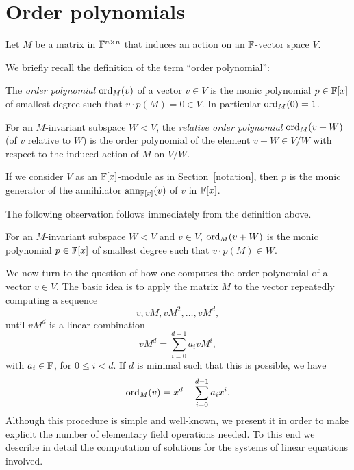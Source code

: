 \section{Order polynomials}
\label{ordpoly}

Let $M$ be a matrix in $\mathbb{F}^{n \times n}$ that induces an action
on an $\mathbb{F}$-vector space $V$.

We briefly recall the definition of the term ``order polynomial'':

\begin{Def}
{\rm
The \emph{order polynomial} $\mathrm{ord}_M(v)$ of a vector $v \in V$ is the
%
%
monic polynomial $p \in \mathbb{F}[x]$ of smallest degree such that $v \cdot
p(M) = 0 \in V$. In particular $\mathrm{ord}_M(0)=1$.

For an $M$-invariant subspace  $W < V$, the \emph{relative order polynomial}
$\mathrm{ord}_M(v+W)$ (of $v$ relative to $W$) is the order polynomial of the element
$v+W \in V/W$ with respect to the induced action of $M$ on $V/W$.
}
\end{Def}

\begin{Rem}
If we consider $V$ as an $\mathbb{F}[x]$-module as in 
Section~\ref{notation}, then $p$ is the monic generator
of the annihilator $\mathrm{ann}_{\mathbb{F}[x]}(v)$ of $v$ in $\mathbb{F}[x]$.
\end{Rem}

The following observation follows immediately from the definition above.

\begin{Lemm}
\label{relorderpol}
%
For an $M$-invariant subspace  $W < V$ and $v\in V$, 
$\mathrm{ord}_M(v+W)$ is the monic polynomial $p \in \mathbb{F}[x]$ of smallest degree such 
that $v \cdot p(M) \in W$.
\end{Lemm}

We now turn to the question of how one computes the order polynomial of
a vector $v \in V$. The basic idea is to apply the matrix
$M$ to the vector repeatedly computing a sequence \[ v, vM, vM^2, \ldots,
vM^d, \]
until $vM^d$ is a linear combination
\[ 
vM^d = \sum_{i=0}^{d-1} a_i vM^i, 
\]
with $a_i \in \mathbb{F}$, for $0 \le i < d$. If $d$ is minimal such that
this is possible, we have
\[ \mathrm{ord}_M(v) = x^d - \sum_{i=0}^{d-1} a_i x^i. 
\]
Although this procedure is simple and well-known, we 
present it in order to make explicit the number of elementary field 
operations needed.
To this end we describe in detail the computation of solutions for
the systems of linear equations involved. 

